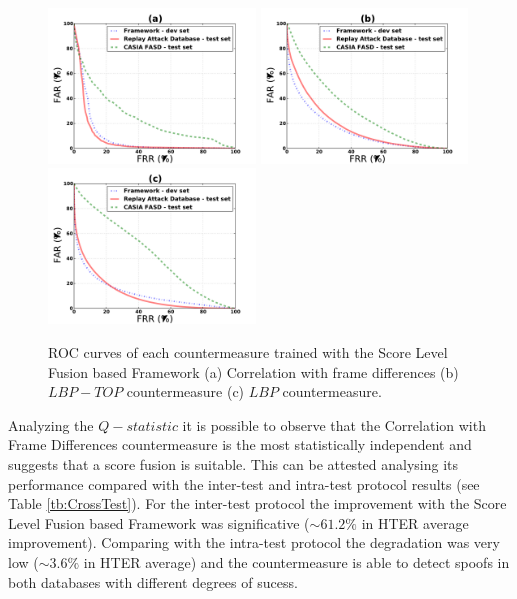 \begin{figure}[ht]
\begin{center}

\includegraphics [width=5.5cm] {plots/FRAMEWORK/MOTION/SUM.pdf} 
\includegraphics [width=5.5cm] {plots/FRAMEWORK/LBPTOP/SUM.pdf}
\includegraphics [width=5.5cm] {plots/FRAMEWORK/LBP/SUM.pdf}

\caption{ROC curves of each countermeasure trained with the Score Level Fusion based Framework (a) Correlation with frame differences (b) $LBP-TOP$ countermeasure (c) $LBP$ countermeasure.} 
\label{fig:ROC_framework}
\end{center}
\end{figure}

Analyzing the $Q-statistic$ it is  possible to observe that the Correlation with Frame Differences countermeasure is the most statistically independent and suggests that a score fusion is suitable. This can be attested analysing its performance compared with the inter-test and intra-test protocol results (see Table \ref{tb:CrossTest}). For the inter-test protocol the improvement with the Score Level Fusion based Framework was significative ($\sim61.2\%$ in HTER average improvement). Comparing with the intra-test protocol the degradation was very low ($\sim3.6\%$ in HTER average) and the countermeasure is able to detect spoofs in both databases with different degrees of sucess.

